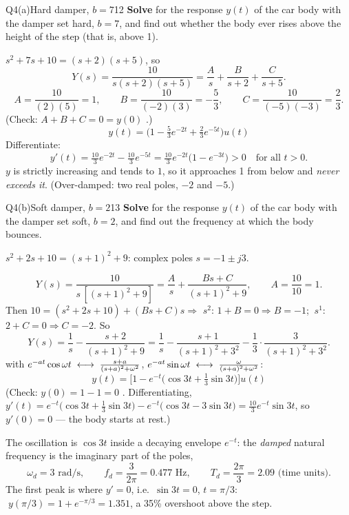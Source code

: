 \begin{qcard}{Q4(a)}{Hard damper, $b=7$}{12}
\textbf{Solve} for the response $y(t)$ of the car body with the damper set hard, $b=7$, and find out whether the body ever rises above the height of the step (that is, above 1).
\end{qcard}
\begin{solution}
 $s^2+7s+10=(s+2)(s+5)$, so
\[Y(s)=\frac{10}{s(s+2)(s+5)}=\frac As+\frac B{s+2}+\frac C{s+5}.\]
\[A=\frac{10}{(2)(5)}=1,\qquad B=\frac{10}{(-2)(3)}=-\frac53,\qquad C=\frac{10}{(-5)(-3)}=\frac23 .\]
(Check: $A+B+C=0=y(0)$ \checkmark.)
\[\boxed{y(t)=\Big(1-\tfrac53e^{-2t}+\tfrac23e^{-5t}\Big)u(t)}\]
 Differentiate:
\[y'(t)=\tfrac{10}3e^{-2t}-\tfrac{10}3e^{-5t}=\tfrac{10}3e^{-2t}\big(1-e^{-3t}\big)>0\quad\text{for all }t>0 .\]
$y$ is strictly increasing and tends to $1$, so it approaches 1 from below and \emph{never exceeds it}. (Over-damped: two real poles, $-2$ and $-5$.)
\end{solution}

\begin{qcard}{Q4(b)}{Soft damper, $b=2$}{13}
\textbf{Solve} for the response $y(t)$ of the car body with the damper set soft, $b=2$, and find out the frequency at which the body bounces.
\end{qcard}
\begin{solution}
 $s^2+2s+10=(s+1)^2+9$: complex poles $s=-1\pm j3$.

\[Y(s)=\frac{10}{s\,[(s+1)^2+9]}=\frac As+\frac{Bs+C}{(s+1)^2+9},\qquad A=\frac{10}{10}=1 .\]
Then $10=(s^2+2s+10)+(Bs+C)s\Rightarrow$ $s^2$: $1+B=0\Rightarrow B=-1$; $\ s^1$: $2+C=0\Rightarrow C=-2$. So
\[Y(s)=\frac1s-\frac{s+2}{(s+1)^2+9}=\frac1s-\frac{s+1}{(s+1)^2+3^2}-\frac13\cdot\frac{3}{(s+1)^2+3^2}.\]
 with $e^{-at}\cos\omega t\;\longleftrightarrow\;\frac{s+a}{(s+a)^2+\omega^2}$, $e^{-at}\sin\omega t\;\longleftrightarrow\;\frac{\omega}{(s+a)^2+\omega^2}$:
\[\boxed{y(t)=\Big[1-e^{-t}\Big(\cos3t+\tfrac13\sin3t\Big)\Big]u(t)}\]
(Check: $y(0)=1-1=0$ \checkmark. Differentiating, $y'(t)=e^{-t}\big(\cos3t+\tfrac13\sin3t\big)-e^{-t}\big(\cos3t-3\sin3t\big)=\tfrac{10}3e^{-t}\sin3t$, so $y'(0)=0$ \checkmark --- the body starts at rest.)

 The oscillation is $\cos3t$ inside a decaying envelope $e^{-t}$: the \emph{damped} natural frequency is the imaginary part of the poles,
\[\omega_d=3\text{ rad/s},\qquad f_d=\frac{3}{2\pi}=0.477\text{ Hz},\qquad T_d=\frac{2\pi}3=2.09\text{ (time units)}.\]
The first peak is where $y'=0$, i.e.\ $\sin3t=0$, $t=\pi/3$: $\;y(\pi/3)=1+e^{-\pi/3}=1.351$, a 35\% overshoot above the step.
\end{solution}

